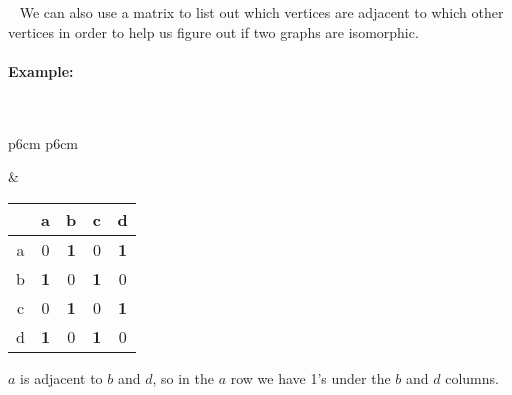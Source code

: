 \documentclass[a4paper,12pt]{book}
\begin{document}
    \begin{intro}{\ }
        We can also use a matrix to list out which vertices are adjacent
        to which other vertices in order to help us figure out if two
        graphs are isomorphic.

        \paragraph{Example:} ~\\

        \begin{tabular}{p{6cm} p{6cm}}
        
            \begin{tikzpicture}
                \filldraw (0,0) circle (1pt) node[left] {a};
                \filldraw (1,0) circle (1pt) node[right] {b};
                \filldraw (1,1) circle (1pt) node[right] {c};
                \filldraw (0,1) circle (1pt) node[left] {d};

                \draw (0,0) -- (1,0) -- (1,1) -- (0,1) -- (0,0);
            \end{tikzpicture}

            &

            \begin{tabular}{c | c c c c}
                & a & b & c & d
                \\ \hline
                a & 0 & \textbf{1} & 0 & \textbf{1}
                \\
                b & \textbf{1} & 0 & \textbf{1} & 0
                \\
                c & 0 & \textbf{1} & 0 & \textbf{1}
                \\
                d & \textbf{1} & 0 & \textbf{1} & 0
            \end{tabular}
            
        \end{tabular}

        $a$ is adjacent to $b$ and $d$, so in the $a$ row we have 1's under the $b$ and $d$ columns.
    \end{intro}
\end{document}
